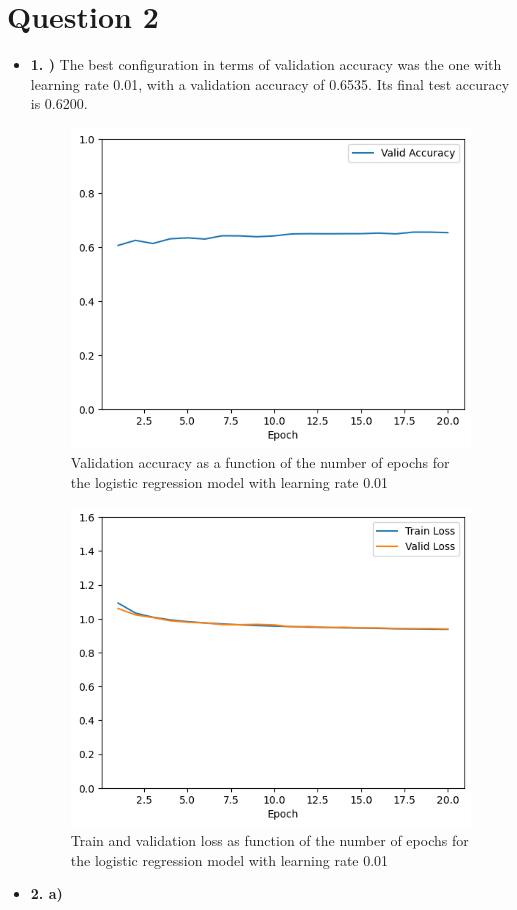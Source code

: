 \documentclass[12pt]{article}
\begin{document}
\section*{Question 2}
\begin{itemize}
    \item \textbf{1. )} The best configuration in terms of validation accuracy was the one with learning rate 0.01, with a validation accuracy of 0.6535. Its final test accuracy is 0.6200.
          \begin{figure}[H]
              \centering
              \includegraphics[width=0.5\linewidth]{../outputs/hw1-q2-1-acc.01.png}
              \caption{Validation accuracy as a function of the number of epochs for the logistic regression model with learning rate 0.01}
              \label{fig:2.1:acc}
          \end{figure}

          \begin{figure}[H]
              \centering
              \includegraphics[width=0.5\linewidth]{../outputs/hw1-q2-1-loss.01.png}
              \caption{Train and validation loss as function of the number of epochs for the logistic regression model with learning rate 0.01}
              \label{fig:2.1:loss}
          \end{figure}

    \item \textbf{2. a)}


\end{itemize}
\end{document}
